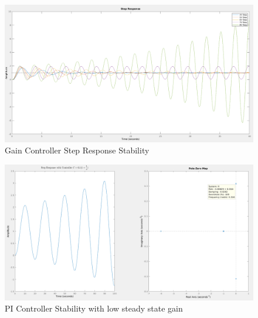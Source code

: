 \documentclass[a4paper, 12pt]{article}
\begin{document}
        \begin{figure}[!h]
            \centering
            \includegraphics[width=\textwidth]{q5.png}
            \caption{Gain Controller Step Response Stability}
            \label{fig:q5a}
        \end{figure}

        \begin{figure}[!h]
            \centering
            \includegraphics[width=\textwidth]{q5b.png}
            \caption{PI Controller Stability with low steady state gain}
            \label{fig:q5b}
        \end{figure}
\end{document}
